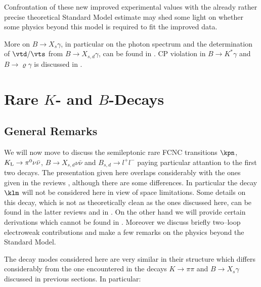 Confrontation of these new
improved experimental values with the already rather precise theoretical
Standard Model estimate may shed some light on whether some
physics beyond this model is required to fit the improved data.

More
on $B\to X_s\gamma$, in particular on the photon spectrum and 
the determination
of $\vtd/\vts$ from $B\to X_{s,d}\gamma$, can be found in
\cite{ALUT,ALIB,Photon,KN98}. 
CP violation in $B \to K^* \gamma$ and $B \to \varrho \gamma$ 
is discussed in \cite{GSW95}.

\section{ Rare $K$- and $B$-Decays}
         \label{sec:HeffRareKB}
\setcounter{equation}{0}
\subsection{General Remarks}
            \label{sec:HeffRareKB:overview}
We will now move to discuss
the semileptonic rare FCNC
transitions $\kpn$,  $K_{\rm L}\to\pi^0\nu\bar\nu$, $B\to X_{s,
d}\nu\bar\nu$ and $B_{s,d}\to l^+l^-$ paying particular attantion
to the first two decays.
The presentation given here overlaps considerably with the ones given
in the reviews \cite{BBL,BF97}, although there are some differences.
In particular the  decay $\klm$ will not be considered here in view of 
space limitations.
Some details on this decay, which is not as theoretically clean as the ones 
discussed here, can be found  in the latter reviews and in \cite{CPRARE}.
On the other hand we will provide certain derivations which cannot
be found in \cite{BBL,BF97}. 
Moreover we discuss briefly two--loop electroweak contributions and
make a few remarks on the physics beyond the Standard Model.

The decay modes considered here are very
similar in their structure which differs considerably from the one
encountered in
the decays $K \to \pi\pi$ and
 $B \to X_s \gamma$  discussed in previous
sections. In particular: 

